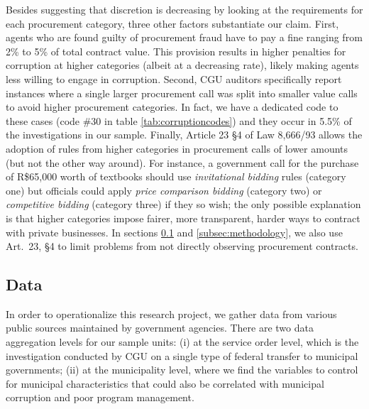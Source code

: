 \documentclass[11pt]{article}
\begin{document}
Besides suggesting that discretion is decreasing by looking at the requirements for each procurement category, three other factors substantiate our claim. First, agents who are found guilty of procurement fraud have to pay a fine ranging from 2\% to 5\% of total contract value. This provision results in higher penalties for corruption at higher categories (albeit at a decreasing rate), likely making agents less willing to engage in corruption. Second, CGU auditors specifically report instances where a single larger procurement call was split into smaller value calls to avoid higher procurement categories. In fact, we have a dedicated code to these cases (code \#30 in table \ref{tab:corruptioncodes}) and they occur in 5.5\% of the investigations in our sample. Finally, Article 23 \S 4 of Law 8,666/93 allows the adoption of rules from higher categories in procurement calls of lower amounts (but not the other way around). For instance, a government call for the purchase of R\$65,000 worth of textbooks should use \emph{invitational bidding} rules (category one) but officials could apply \emph{price comparison bidding} (category two) or \emph{competitive bidding} (category three) if they so wish; the only possible explanation is that higher categories impose fairer, more transparent, harder ways to contract with private businesses. In sections \ref{subsec:data} and \ref{subsec:methodology}, we also use Art.~23, \S 4 to limit problems from not directly observing procurement contracts.

\subsection{Data} \label{subsec:data}

In order to operationalize this research project, we gather data from various public sources maintained by government agencies. There are two data aggregation levels for our sample units: (i) at the service order level, which is the investigation conducted by CGU on a single type of federal transfer to municipal governments; (ii) at the municipality level, where we find the variables to control for municipal characteristics that could also be correlated with municipal corruption and poor program management.
\end{document}
